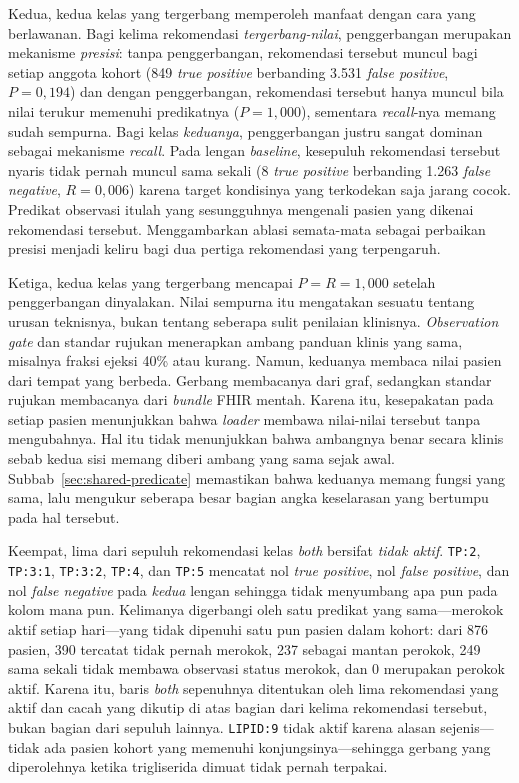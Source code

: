 Kedua, kedua kelas yang tergerbang memperoleh manfaat dengan cara yang berlawanan. Bagi kelima rekomendasi
\emph{tergerbang-nilai}, penggerbangan merupakan mekanisme \emph{presisi}: tanpa
penggerbangan, rekomendasi tersebut muncul bagi setiap anggota kohort (849 \emph{true positive}
berbanding 3.531 \emph{false positive}, $P = 0{,}194$) dan dengan penggerbangan, rekomendasi
tersebut hanya muncul bila nilai terukur memenuhi predikatnya ($P = 1{,}000$), sementara
\emph{recall}-nya memang sudah sempurna. Bagi kelas \emph{keduanya}, penggerbangan justru sangat dominan sebagai mekanisme
\emph{recall}. Pada lengan \emph{baseline}, kesepuluh rekomendasi tersebut nyaris tidak
pernah muncul sama sekali (8 \emph{true positive} berbanding 1.263 \emph{false negative}, $R
= 0{,}006$) karena target kondisinya yang terkodekan saja jarang cocok. Predikat observasi
itulah yang sesungguhnya mengenali pasien yang dikenai rekomendasi tersebut.
Menggambarkan ablasi semata-mata sebagai perbaikan presisi menjadi keliru bagi dua pertiga rekomendasi yang terpengaruh.

Ketiga, kedua kelas yang tergerbang mencapai $P = R = 1{,}000$ setelah penggerbangan
dinyalakan. Nilai sempurna itu mengatakan sesuatu tentang urusan teknisnya, bukan tentang
seberapa sulit penilaian klinisnya. \emph{Observation gate} dan standar rujukan menerapkan ambang panduan klinis yang sama,
misalnya fraksi ejeksi 40\% atau kurang. Namun, keduanya membaca nilai pasien dari tempat
yang berbeda. Gerbang membacanya dari graf, sedangkan standar rujukan membacanya dari
\emph{bundle} FHIR mentah. Karena itu, kesepakatan pada setiap pasien
menunjukkan bahwa \emph{loader} membawa nilai-nilai tersebut tanpa mengubahnya. Hal itu tidak
menunjukkan bahwa ambangnya benar secara klinis sebab kedua sisi memang diberi ambang yang
sama sejak awal. Subbab~\ref{sec:shared-predicate} memastikan bahwa keduanya memang fungsi yang
sama, lalu mengukur seberapa besar bagian angka keselarasan yang bertumpu pada hal tersebut.

Keempat, lima dari sepuluh rekomendasi kelas \emph{both} bersifat \emph{tidak aktif}.
\texttt{TP:2}, \texttt{TP:3:1}, \texttt{TP:3:2}, \texttt{TP:4}, dan \texttt{TP:5} mencatat nol
\emph{true positive}, nol \emph{false positive}, dan nol \emph{false negative} pada \emph{kedua}
lengan sehingga tidak menyumbang apa pun pada kolom mana pun. Kelimanya digerbangi oleh satu
predikat yang sama---merokok aktif setiap hari---yang tidak dipenuhi satu pun pasien dalam
kohort: dari 876 pasien, 390 tercatat tidak pernah merokok,
237 sebagai mantan perokok, 249 sama sekali tidak membawa observasi
status merokok, dan 0 merupakan perokok aktif. Karena itu, baris \emph{both}
sepenuhnya ditentukan oleh lima rekomendasi yang aktif dan cacah yang dikutip di atas bagian dari
kelima rekomendasi tersebut, bukan bagian dari sepuluh lainnya. \texttt{LIPID:9} tidak aktif karena alasan
sejenis---tidak ada pasien kohort yang memenuhi konjungsinya---sehingga gerbang yang
diperolehnya ketika trigliserida dimuat tidak pernah terpakai.

